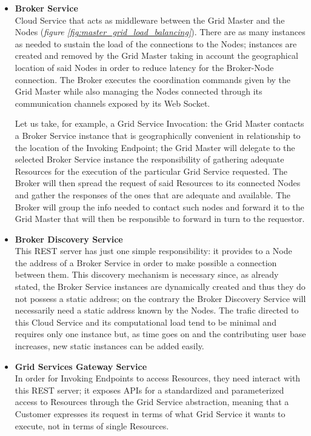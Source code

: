 \begin{itemize}
    \item \textbf{Broker Service}\\
    Cloud Service that acts as middleware between the Grid Master and the Nodes (\textit{figure \ref{fig:master_grid_load_balancing}}). There are as many instances as needed to sustain the load of the connections to the Nodes; instances are created and removed by the Grid Master taking in account the geographical location of said Nodes in order to reduce latency for the Broker-Node connection.
    The Broker executes the coordination commands given by the Grid Master while also managing the Nodes connected through its communication channels exposed by its Web Socket.
    
    Let us take, for example, a Grid Service Invocation: the Grid Master contacts a Broker Service instance that is geographically convenient in relationship to the location of the Invoking Endpoint; the Grid Master will delegate to the selected Broker Service instance the responsibility of gathering adequate Resources for the execution of the particular Grid Service requested. The Broker will then spread the request of said Resources to its connected Nodes and gather the responses of the ones that are adequate and available. The Broker will group the info needed to contact such nodes and forward it to the Grid Master that will then be responsible to forward in turn to the requestor.

    \item \textbf{Broker Discovery Service}\\
    This REST server has just one simple responsibility: it provides to a Node the address of a Broker Service in order to make possible a connection between them. This discovery mechanism is necessary since, as already stated, the Broker Service instances are dynamically created and thus they do not possess a static address; on the contrary the Broker Discovery Service will necessarily need a static address known by the Nodes. The trafic directed to this Cloud Service and its computational load tend to be minimal and requires only one instance but, as time goes on and the contributing user base increases, new static instances can be added easily.

    \item \textbf{Grid Services Gateway Service}\\
    In order for Invoking Endpoints to access Resources, they need interact with this REST server; it exposes APIs for a standardized and parameterized access to Resources through the Grid Service abstraction, meaning that a Customer expresses its request in terms of what Grid Service it wants to execute, not in terms of single Resources.
    

\end{itemize}
